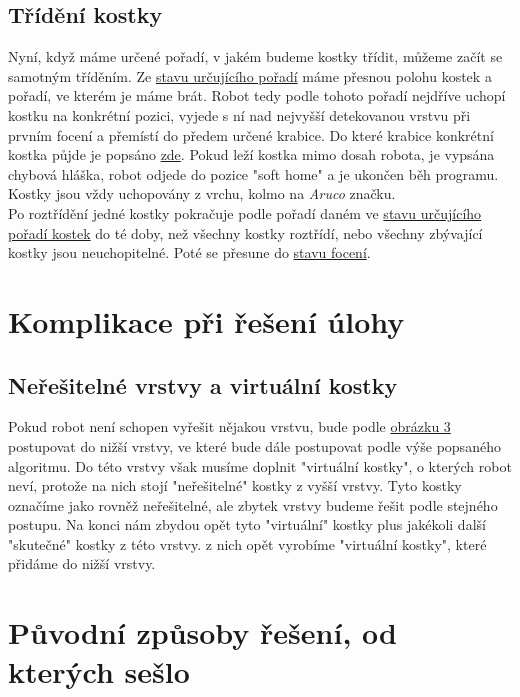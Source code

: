 \documentclass[journal,twoside,web]{ieeecolor}
\begin{document}
\subsection{Třídění kostky}
Nyní, když máme určené pořadí, v jakém budeme kostky třídit, můžeme začít se samotným tříděním.
Ze \hyperlink{layer_sort}{stavu určujícího pořadí} máme přesnou polohu kostek a
pořadí, ve kterém je máme brát. Robot tedy podle tohoto pořadí nejdříve uchopí kostku na konkrétní pozici, vyjede
s ní nad nejvyšší detekovanou vrstvu při prvním focení a přemístí do předem určené krabice.
Do které krabice konkrétní kostka půjde je popsáno \hyperlink{stav_detekce_krabic}{zde}. Pokud leží kostka mimo dosah robota,
je vypsána chybová hláška, robot odjede do pozice "soft home" a je ukončen běh programu. Kostky jsou vždy uchopovány z vrchu, kolmo na
\textit{Aruco} značku.\\
Po roztřídění jedné kostky pokračuje podle pořadí daném ve \hyperlink{layer_sort}{stavu určujícího pořadí kostek} do té doby,
než všechny kostky roztřídí, nebo všechny zbývající kostky jsou neuchopitelné. Poté se přesune do \hyperlink{capturing_state}{stavu focení}.

\section{Komplikace při řešení úlohy}
\subsection{Neřešitelné vrstvy a virtuální kostky}
Pokud robot není schopen vyřešit nějakou vrstvu, bude podle \hyperlink{diagram1}{obrázku 3} postupovat do nižší vrstvy,
ve které bude dále postupovat podle výše popsaného algoritmu. Do této vrstvy však musíme doplnit "virtuální kostky",
o kterých robot neví, protože na nich stojí "neřešitelné" kostky z vyšší vrstvy. Tyto kostky označíme
jako rovněž neřešitelné, ale zbytek vrstvy budeme řešit podle stejného postupu. Na konci nám zbydou opět tyto "virtuální"
kostky plus jakékoli další "skutečné" kostky z této vrstvy. z nich opět vyrobíme "virtuální kostky", které
přidáme do nižší vrstvy.



\section{Původní způsoby řešení, od kterých sešlo}
\end{document}

